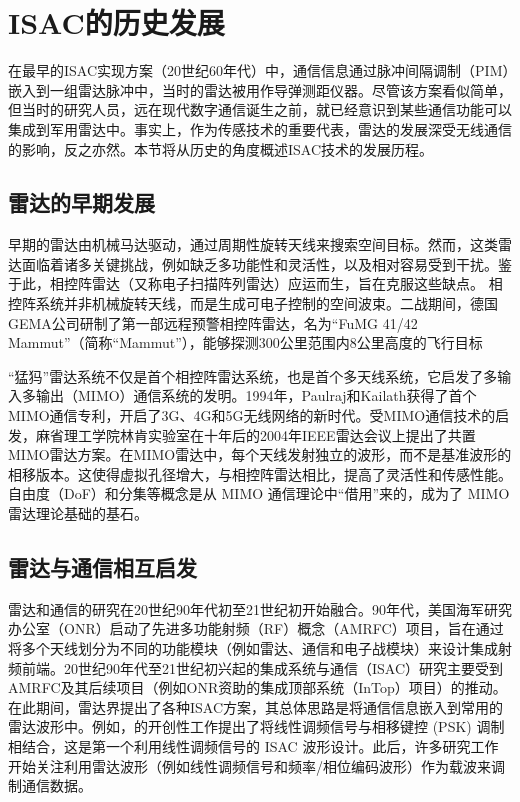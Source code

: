 \section{ISAC的历史发展}

在最早的ISAC实现方案（20世纪60年代）中，通信信息通过脉冲间隔调制（PIM）嵌入到一组雷达脉冲中，当时的雷达被用作导弹测距仪器\cite{4337601}。尽管该方案看似简单，但当时的研究人员，远在现代数字通信诞生之前，就已经意识到某些通信功能可以集成到军用雷达中。事实上，作为传感技术的重要代表，雷达的发展深受无线通信的影响，反之亦然。本节将从历史的角度概述ISAC技术的发展历程。

\subsection{雷达的早期发展}

早期的雷达由机械马达驱动，通过周期性旋转天线来搜索空间目标。然而，这类雷达面临着诸多关键挑战，例如缺乏多功能性和灵活性，以及相对容易受到干扰。鉴于此，相控阵雷达（又称电子扫描阵列雷达）应运而生，旨在克服这些缺点。
相控阵系统并非机械旋转天线，而是生成可电子控制的空间波束。二战期间，德国GEMA公司研制了第一部远程预警相控阵雷达，名为“FuMG 41/42 Mammut”（简称“Mammut”），能够探测300公里范围内8公里高度的飞行目标

“猛犸”雷达系统不仅是首个相控阵雷达系统，也是首个多天线系统，它启发了多输入多输出（MIMO）通信系统的发明。1994年，Paulraj和Kailath获得了首个MIMO通信专利，开启了3G、4G和5G无线网络的新时代。受MIMO通信技术的启发，麻省理工学院林肯实验室在十年后的2004年IEEE雷达会议上提出了共置MIMO雷达方案。在MIMO雷达中，每个天线发射独立的波形，而不是基准波形的相移版本\cite{8930009}。这使得虚拟孔径增大，与相控阵雷达相比，提高了灵活性和传感性能。自由度（DoF）和分集等概念是从 MIMO 通信理论中“借用”来的，成为了 MIMO 雷达理论基础的基石。

\subsection{雷达与通信相互启发}

雷达和通信的研究在20世纪90年代初至21世纪初开始融合。90年代，美国海军研究办公室（ONR）启动了先进多功能射频（RF）概念（AMRFC）项目，旨在通过将多个天线划分为不同的功能模块（例如雷达、通信和电子战模块）来设计集成射频前端。20世纪90年代至21世纪初兴起的集成系统与通信（ISAC）研究主要受到AMRFC及其后续项目（例如ONR资助的集成顶部系统（InTop）项目）的推动。在此期间，雷达界提出了各种ISAC方案，其总体思路是将通信信息嵌入到常用的雷达波形中。例如，的开创性工作提出了将线性调频信号与相移键控 (PSK) 调制相结合，这是第一个利用线性调频信号的 ISAC 波形设计。此后，许多研究工作开始关注利用雷达波形（例如线性调频信号和频率/相位编码波形）作为载波来调制通信数据。

